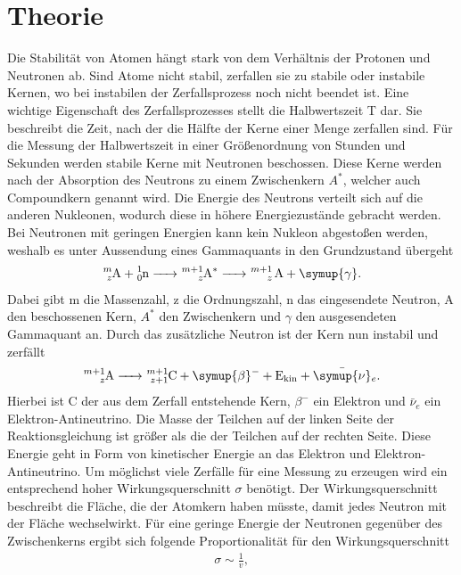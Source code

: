 \section{Theorie}\justifying
Die Stabilität von Atomen hängt stark von dem Verhältnis der Protonen und Neutronen ab. Sind
Atome nicht stabil, zerfallen sie zu stabile oder instabile Kernen, wo bei instabilen der Zerfallsprozess
noch nicht beendet ist.  Eine wichtige Eigenschaft des Zerfallsprozesses stellt die Halbwertszeit T
dar. Sie beschreibt die Zeit, nach der die Hälfte der Kerne einer Menge zerfallen sind.
Für die Messung der Halbwertszeit in einer Größenordnung von Stunden und Sekunden werden
stabile Kerne mit Neutronen beschossen. Diese Kerne werden nach der Absorption des Neutrons zu einem Zwischenkern $A^*$, welcher
auch Compoundkern genannt wird. Die Energie des Neutrons verteilt sich auf die anderen Nukleonen,
wodurch diese in höhere Energiezustände gebracht werden. Bei Neutronen mit geringen 
Energien kann kein Nukleon abgestoßen werden, weshalb es unter Aussendung eines Gammaquants in den Grundzustand übergeht \cite{V702}
\begin{align}
    \ce{_z^mA + _0^1n -> _z^{m+1}A^* -> _z^{m+1} A + \symup{\gamma}}. \label{eq:1} %
\end{align}
Dabei gibt m die Massenzahl, z die Ordnungszahl, n das eingesendete Neutron, A den beschossenen Kern,
$A^*$ den Zwischenkern und $\gamma$ den ausgesendeten Gammaquant an. Durch das zusätzliche
Neutron ist der Kern nun instabil und zerfällt \cite{V702}
\begin{align}
    \ce{_z^{m+1}A -> _{z+1}^{m+1}C + \symup{\beta}^- + E_{\text{kin}} + \bar{\symup{\nu}}_e } \label{eq:2}.
\end{align}
Hierbei ist C der aus dem Zerfall entstehende Kern, $\beta ^-$ ein Elektron und $\bar{\nu}_e$ ein Elektron-Antineutrino.
Die Masse der Teilchen auf der linken Seite der Reaktionsgleichung ist größer als die der Teilchen auf
der rechten Seite. Diese Energie geht in Form von kinetischer Energie an das Elektron und
Elektron-Antineutrino. Um möglichst viele Zerfälle für eine Messung zu erzeugen wird ein
entsprechend hoher Wirkungsquerschnitt $\sigma$ benötigt. Der Wirkungsquerschnitt beschreibt
die Fläche, die der Atomkern haben müsste, damit jedes Neutron mit der Fläche wechselwirkt.
Für eine geringe Energie der Neutronen gegenüber des Zwischenkerns ergibt sich folgende
Proportionalität für den Wirkungsquerschnitt \cite{V702}
\begin{align}
    \sigma \sim \frac{1}{v}, \label{eq:3}
\end{align}
